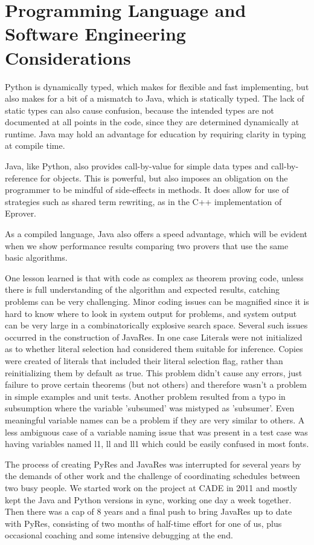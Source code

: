 \documentclass{llncs}
\begin{document}
\section{Programming Language and Software Engineering Considerations}

Python is dynamically typed, which makes for flexible and fast implementing, but also makes
for a bit of a mismatch to Java, which is statically typed.  The lack of static
types can also cause confusion, because the intended types are not
documented at all points in the code, since they are determined dynamically at
runtime.  Java may hold an advantage for education by requiring clarity in typing
at compile time.

Java, like Python, also provides call-by-value for simple data types and call-by-reference for
objects.  This is powerful, but also imposes an obligation on the programmer to
be mindful of side-effects in methods.  It does allow for use of strategies such as
shared term rewriting, as in the C++ implementation of Eprover.

As a compiled language, Java also offers a speed advantage, which will be evident
when we show performance results comparing two provers that use the same basic algorithms.

One lesson learned is that with code as complex as theorem proving code, unless there is
full understanding of the algorithm and expected results, catching problems can be very
challenging.  Minor coding issues can be magnified since it is hard to know where to
look in system output for problems, and system output can be very large in a combinatorically
explosive search space.  Several such issues occurred in the construction of JavaRes.  In one
case Literals were not initialized as to whether literal selection had considered them
suitable for inference.  Copies were created of literals that included their literal
selection flag, rather than reinitializing them by default as true.  This problem didn't cause
any errors, just failure to prove certain theorems (but not others) and therefore wasn't a
problem in simple examples and unit tests.  Another problem resulted from a typo in
subsumption where the variable 'subsumed' was mistyped as 'subsumer'.  Even meaningful
variable names can be a problem if they are very similar to others.  A less ambiguous case
of a variable naming issue that was present in a test case was having variables named l1, ll and ll1
which could be easily confused in most fonts.

The process of creating PyRes and JavaRes was interrupted for several years by the demands
of other work and the challenge of coordinating schedules between two busy people.  We started
work on the project at CADE in 2011 and mostly kept the Java and Python versions in sync, working
one day a week together.  Then there was a cap of 8 years and a final push to bring JavaRes
up to date with PyRes, consisting of two months of half-time effort for one of us, plus occasional
coaching and some intensive debugging at the end.
\end{document}
